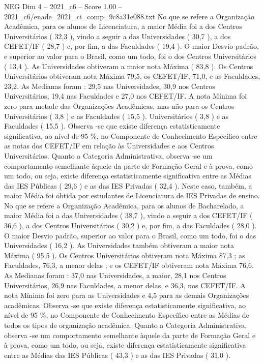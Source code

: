 \begin{textsample}{NEG Dim 4 – 2021\_c6 – Score 1.00 – 2021\_c6/enade\_2021\_ci\_comp\_9c8a31e088.txt}
No que se refere a Organização Acadêmica, para os alunos de Licenciatura, a maior Média foi a dos Centros Universitários ( 32,3 ), vindo a seguir a das Universidades ( 30,7 ), a dos CEFET/IF ( 28,7 ) e, por fim, a das Faculdades ( 19,4 ).
O maior Desvio padrão, e superior ao valor para o Brasil, como um todo, foi o dos Centros Universitários ( 13,4 ).
As Universidades obtiveram a maior nota Máxima ( 83,8 ).
Os Centros Universitários obtiveram nota Máxima 79,5, os CEFET/IF, 71,0, e as Faculdades, 23,2.
As Medianas foram : 29,5 nas Universidades, 30,9 nos Centros Universitários, 19,4 nas Faculdades e 27,0 nos CEFET/IF.
A nota Mínima foi zero para metade das Organizações Acadêmicas, mas não para os Centros Universitários ( 3,8 ) e as Faculdades ( 15,5 ).
Universitários ( 3,8 ) e as Faculdades ( 15,5 ).
Observa -se que existe diferença estatisticamente significativa, ao nível de 95 \%, no Componente de Conhecimento Específico entre as notas dos CEFET/IF em relação às Universidades e aos Centros Universitários.
Quanto a Categoria Administrativa, observa -se um comportamento semelhante àquele da parte de Formação Geral e à prova, como um todo, ou seja, existe diferença estatisticamente significativa entre as Médias das IES Públicas ( 29,6 ) e as das IES Privadas ( 32,4 ).
Neste caso, também, a maior Média foi obtida por estudantes de Licenciatura de IES Privadas de ensino.
No que se refere a Organização Acadêmica, para os alunos de Bacharelado, a maior Média foi a das Universidades ( 38,7 ), vindo a seguir a dos CEFET/IF ( 36,6 ), a dos Centros Universitários ( 30,2 ) e, por fim, a das Faculdades ( 28,0 ).
O maior Desvio padrão, superior ao valor para o Brasil, como um todo, foi o das Universidades ( 16,2 ).
As Universidades também obtiveram a maior nota Máxima ( 95,5 ).
Os Centros Universitários obtiveram nota Máxima 87,3 ; as Faculdades, 76,3, a menor delas ; e os CEFET/IF obtiveram nota Máxima 76,6.
As Medianas foram : 37,0 nas Universidades, a maior, 28,1 nos Centros Universitários, 26,9 nas Faculdades, a menor delas, e 36,3, nos CEFET/IF.
A nota Mínima foi zero para as Universidades e 4,5 para as demais Organizações acadêmicas.
Observa -se que existe diferença estatisticamente significativa, ao nível de 95 \%, no Componente de Conhecimento Específico entre as Médias de todos os tipos de organização acadêmica.
Quanto a Categoria Administrativa, observa -se um comportamento semelhante àquele da parte de Formação Geral e à prova, como um todo, ou seja, existe diferença estatisticamente significativa entre as Médias das IES Públicas ( 43,3 ) e as das IES Privadas ( 31,0 ).

\end{textsample}
